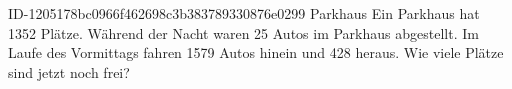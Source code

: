 \begin{exercise}
      {ID-1205178bc0966f462698c3b383789330876e0299}
      {Parkhaus}
  \ifproblem\problem
    Ein Parkhaus hat \num{1352} Plätze. Während der Nacht waren 25 Autos im Parkhaus
    abgestellt. Im Laufe des Vormittags fahren \num{1579} Autos hinein und 428 heraus.
    Wie viele Plätze sind jetzt noch frei?
  \fi
\end{exercise}
